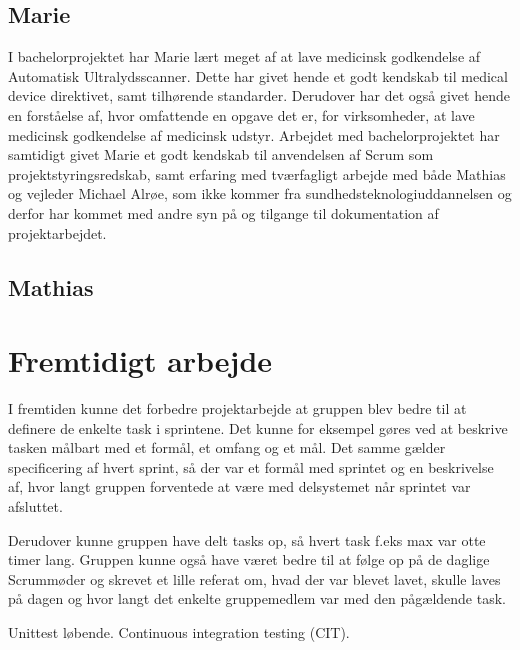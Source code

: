 \subsection{Marie}
I bachelorprojektet har Marie lært meget af at lave medicinsk godkendelse af Automatisk Ultralydsscanner. Dette har givet hende et godt kendskab til medical device direktivet, samt tilhørende standarder. Derudover har det også givet hende en forståelse af, hvor
omfattende en opgave det er, for virksomheder, at lave medicinsk godkendelse af medicinsk udstyr. Arbejdet med bachelorprojektet har samtidigt givet Marie et godt kendskab til anvendelsen af Scrum som projektstyringsredskab, samt erfaring med tværfagligt arbejde med både Mathias og vejleder Michael Alrøe, som ikke kommer fra sundhedsteknologiuddannelsen og derfor har kommet med andre syn på og tilgange til dokumentation af projektarbejdet.

\subsection{Mathias}

\section{Fremtidigt arbejde}
I fremtiden kunne det forbedre projektarbejde at gruppen blev bedre til at definere de enkelte task i sprintene. Det kunne for eksempel gøres ved at beskrive tasken målbart med et formål, et omfang og et mål. Det samme gælder specificering af hvert sprint, så der var et formål med sprintet og en beskrivelse af, hvor langt gruppen forventede at være med delsystemet når sprintet var afsluttet.

Derudover kunne gruppen have delt tasks op, så hvert task f.eks max var otte timer lang. Gruppen kunne også have været bedre til at følge op på de daglige Scrummøder og skrevet et lille referat om, hvad der var blevet lavet, skulle laves på dagen og hvor langt det enkelte gruppemedlem var med den pågældende task.

Unittest løbende. Continuous integration testing (CIT). 